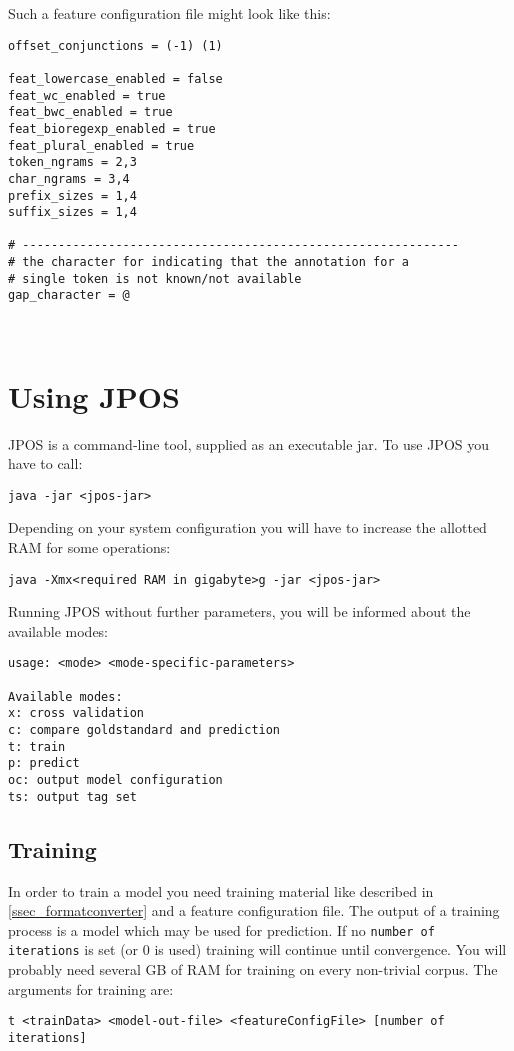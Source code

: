 \documentclass[11pt,a4paper,halfparskip]{scrartcl}
\begin{document}
Such a feature configuration file might look like this:

\begin{verbatim}
offset_conjunctions = (-1) (1)

feat_lowercase_enabled = false
feat_wc_enabled = true 
feat_bwc_enabled = true
feat_bioregexp_enabled = true
feat_plural_enabled = true
token_ngrams = 2,3
char_ngrams = 3,4
prefix_sizes = 1,4
suffix_sizes = 1,4

# -------------------------------------------------------------
# the character for indicating that the annotation for a
# single token is not known/not available
gap_character = @



\end{verbatim}

\section{Using JPOS}



JPOS is a command-line tool, supplied as an executable jar. To use JPOS you have to call:
\begin{verbatim} 
java -jar <jpos-jar>
\end{verbatim}
Depending on your system configuration you will have to increase the allotted RAM for some operations:
\begin{verbatim} 
java -Xmx<required RAM in gigabyte>g -jar <jpos-jar>
\end{verbatim}
Running JPOS without further parameters, you will be informed about
the available modes:
\begin{verbatim} 
usage: <mode> <mode-specific-parameters>

Available modes:
x: cross validation
c: compare goldstandard and prediction
t: train
p: predict
oc: output model configuration
ts: output tag set
\end{verbatim}

\subsection{Training}
In order to train a model you need training material like described in \ref{ssec_formatconverter} and a feature configuration file. The output of a training process is a model which may be used for prediction. If no \texttt{number of iterations} is set (or 0 is used) training will continue until convergence. You will probably need several GB of RAM for training on every non-trivial corpus.
The arguments for training are:
\begin{verbatim}
t <trainData> <model-out-file> <featureConfigFile> [number of iterations]
\end{verbatim}
\end{document}
